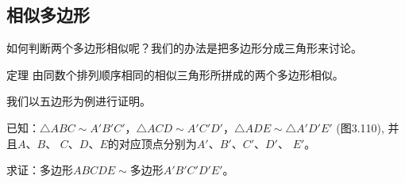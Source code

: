 \subsection{相似多边形}
如何判断两个多边形相似呢？我们的办法是把多边形分成三角形来讨论。

\begin{Theorem}[多边形相似的判定定理]{定理} 
由同数个排列顺序相同的相似三角形所拼成的两个多边形相似。 
\end{Theorem}

我们以五边形为例进行证明。

已知：$\triangle ABC\sim A'B'C'$，$\triangle ACD\sim A'C'D'$，$\triangle ADE\sim \triangle A'D'E'$ (图3.110), 并且$A$、$B$、
$C$、$D$、$E$的对应顶点分别为$A'$、$B'$、$C'$、$D'$、
$E'$。

求证：多边形$ABCDE\sim $多边形$A'B'C'D'E'$。

\begin{figure}
    \centering
\begin{tikzpicture}
\end{tikzpicture}
    \caption{}
\end{figure}


